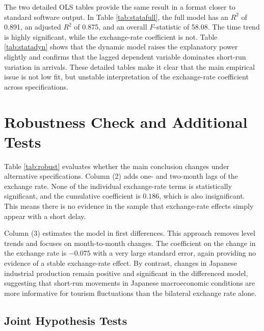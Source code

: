 \documentclass[12pt,a4paper]{article}
\begin{document}
The two detailed OLS tables provide the same result in a format closer to standard software output. In Table \ref{tab:statafull}, the full model has an $R^2$ of 0.891, an adjusted $R^2$ of 0.875, and an overall $F$-statistic of 58.08. The time trend is highly significant, while the exchange-rate coefficient is not. Table \ref{tab:statadyn} shows that the dynamic model raises the explanatory power slightly and confirms that the lagged dependent variable dominates short-run variation in arrivals. These detailed tables make it clear that the main empirical issue is not low fit, but unstable interpretation of the exchange-rate coefficient across specifications.

\section{Robustness Check and Additional Tests}






Table \ref{tab:robust} evaluates whether the main conclusion changes under alternative specifications. Column (2) adds one- and two-month lags of the exchange rate. None of the individual exchange-rate terms is statistically significant, and the cumulative coefficient is $0.186$, which is also insignificant. This means there is no evidence in the sample that exchange-rate effects simply appear with a short delay.

Column (3) estimates the model in first differences. This approach removes level trends and focuses on month-to-month changes. The coefficient on the change in the exchange rate is $-0.075$ with a very large standard error, again providing no evidence of a stable exchange-rate effect. By contrast, changes in Japanese industrial production remain positive and significant in the differenced model, suggesting that short-run movements in Japanese macroeconomic conditions are more informative for tourism fluctuations than the bilateral exchange rate alone.

\subsection{Joint Hypothesis Tests}
\end{document}
